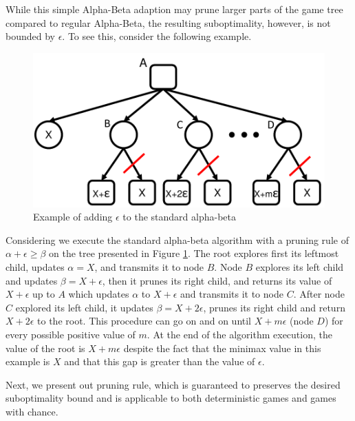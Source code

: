 \documentclass[runningheads]{llncs}
\begin{document}
While this simple Alpha-Beta adaption may prune larger parts of the game tree compared to regular Alpha-Beta, the resulting suboptimality, however, is not bounded by $\epsilon$.
To see this, consider the following example. 

\begin{figure}
	\centering
	\includegraphics[width=0.85\columnwidth]{Figures/example_e.pdf}
	\caption{Example of adding $\epsilon$ to the standard alpha-beta}
	\label{fig:example-e}
\end{figure}

Considering we execute the standard alpha-beta algorithm with a pruning rule of $\alpha+\epsilon \geq \beta$ on the tree presented in Figure \ref{fig:example-e}.
The root explores first its leftmost child, updates $\alpha=X$, and transmits it to node $B$.
Node $B$ explores its left child and updates $\beta=X+\epsilon$, then it prunes its right child, and returns its value of $X+\epsilon$ up to $A$ which updates $\alpha$ to $X+\epsilon$ and transmits it to node $C$.
After node $C$ explored its left child, it updates $\beta=X+2\epsilon$, prunes its right child and return $X+2\epsilon$ to the root.
This procedure can go on and on until $X+m\epsilon$ (node $D$) for every possible positive value of $m$.
At the end of the algorithm execution, the value of the root is $X+m\epsilon$ despite the fact that the minimax value in this example is $X$ and that this gap is greater than the value of $\epsilon$.


Next, we present out pruning rule, which is guaranteed to preserves the desired suboptimality bound and is applicable to both deterministic games and games with chance. 
\end{document}
